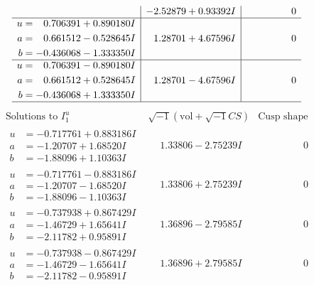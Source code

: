 \documentclass[1p]{elsarticle_modified}
\theoremstyle{definition}
\newcommand{\I}{\sqrt{-1}}
\begin{document}
$$\begin{array}{c|c|c}
 & -2.52879 + 0.93392 I & \phantom{-0.000000 } 0 \\ \hline\begin{aligned}
u &= \phantom{-}0.706391 + 0.890180 I \\
a &= \phantom{-}0.661512 - 0.528645 I \\
b &= -0.436068 - 1.333350 I\end{aligned}
 & \phantom{-}1.28701 + 4.67596 I & \phantom{-0.000000 } 0 \\ \hline\begin{aligned}
u &= \phantom{-}0.706391 - 0.890180 I \\
a &= \phantom{-}0.661512 + 0.528645 I \\
b &= -0.436068 + 1.333350 I\end{aligned}
 & \phantom{-}1.28701 - 4.67596 I & \phantom{-0.000000 } 0\\
 \hline 
 \end{array}$$\newpage$$\begin{array}{c|c|c}  
\text{Solutions to }I^u_{1}& \I (\text{vol} + \sqrt{-1}CS) & \text{Cusp shape}\\
 \hline 
\begin{aligned}
u &= -0.717761 + 0.883186 I \\
a &= -1.20707 + 1.68520 I \\
b &= -1.88096 + 1.10363 I\end{aligned}
 & \phantom{-}1.33806 - 2.75239 I & \phantom{-0.000000 } 0 \\ \hline\begin{aligned}
u &= -0.717761 - 0.883186 I \\
a &= -1.20707 - 1.68520 I \\
b &= -1.88096 - 1.10363 I\end{aligned}
 & \phantom{-}1.33806 + 2.75239 I & \phantom{-0.000000 } 0 \\ \hline\begin{aligned}
u &= -0.737938 + 0.867429 I \\
a &= -1.46729 + 1.65641 I \\
b &= -2.11782 + 0.95891 I\end{aligned}
 & \phantom{-}1.36896 - 2.79585 I & \phantom{-0.000000 } 0 \\ \hline\begin{aligned}
u &= -0.737938 - 0.867429 I \\
a &= -1.46729 - 1.65641 I \\
b &= -2.11782 - 0.95891 I\end{aligned}
 & \phantom{-}1.36896 + 2.79585 I & \phantom{-0.000000 } 0 \\ \hline\begin{aligned}

\end{aligned}
\end{array}$$
\end{document}
